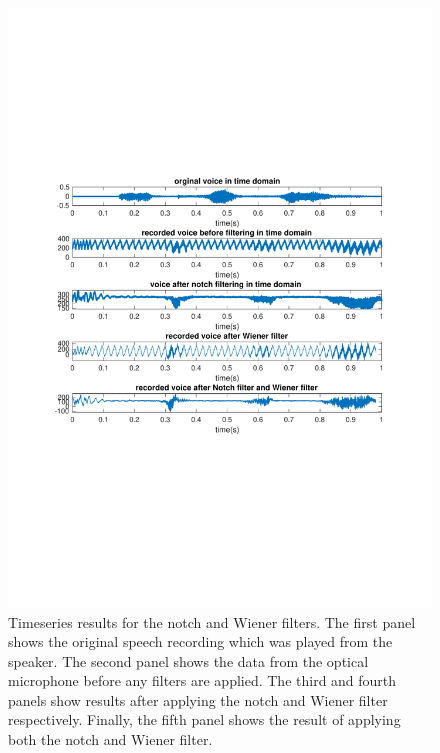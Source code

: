 \documentclass[paper-main.tex]{subfiles}
\begin{document}
\begin{figure}
\begin{center}
\includegraphics[width=\textwidth,trim={0cm 8.7cm 0 8.3cm},clip]{figures/timeSeriesNotchWiener.pdf}
\end{center}
\caption{\label{fig:timeNotchWiener}
Timeseries results for the notch and Wiener filters. 
The first panel shows the original speech recording which was played from the speaker. 
The second panel shows the data from the optical microphone before any filters are applied. 
The third and fourth panels show results after applying the notch and Wiener filter respectively. 
Finally, the fifth panel shows the result of applying both the notch and Wiener filter. 
}
\end{figure}
\end{document}
